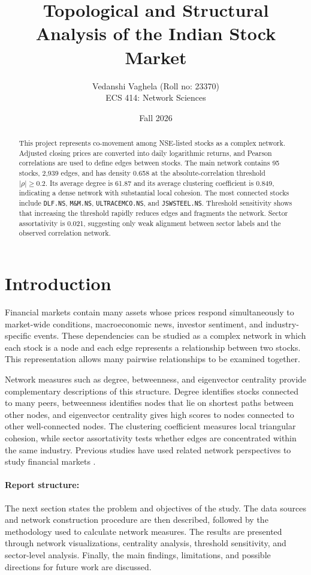 \documentclass[12pt]{article}
\title{Topological and Structural Analysis of the Indian Stock Market}
\author{Vedanshi Vaghela (Roll no: 23370)\\ECS 414: Network Sciences}
\date{Fall 2026}
\numberwithin{equation}{section}
\begin{document}
\maketitle

\begin{abstract}
This project represents co-movement among NSE-listed stocks as a complex
network. Adjusted closing prices are converted into daily logarithmic returns,
and Pearson correlations are used to define edges between stocks. The main
network contains 95 stocks, 2,939 edges, and has density 0.658 at the
absolute-correlation threshold $|\rho|\geq 0.2$. Its average degree is
61.87 and its average clustering coefficient is 0.849, indicating a dense
network with substantial local cohesion. The most connected stocks include
\texttt{DLF.NS}, \texttt{M\&M.NS}, \texttt{ULTRACEMCO.NS}, and
\texttt{JSWSTEEL.NS}. Threshold sensitivity shows that increasing the
threshold rapidly reduces edges and fragments the network. Sector
assortativity is 0.021, suggesting only weak alignment between sector labels
and the observed correlation network.
\end{abstract}

\tableofcontents
\newpage

\section{Introduction}
Financial markets contain many assets whose prices respond simultaneously to
market-wide conditions, macroeconomic news, investor sentiment, and
industry-specific events. These dependencies can be studied as a complex
network in which each stock is a node and each edge represents a relationship
between two stocks. This representation allows many pairwise relationships to
be examined together.

Network measures such as degree, betweenness, and eigenvector centrality provide complementary descriptions of this structure. Degree identifies stocks connected to many peers, betweenness identifies nodes
that lie on shortest paths between other nodes, and eigenvector centrality
gives high scores to nodes connected to other well-connected nodes. The
clustering coefficient measures local triangular cohesion, while sector
assortativity tests whether edges are concentrated within the same industry.
Previous
studies have used related network perspectives to study financial markets
\cite{chi2010network,moghadam2019complex}.

\paragraph{Report structure: } The next section states
the problem and objectives of the study. The data sources and network
construction procedure are then described, followed by the methodology used
to calculate network measures. The results are presented through network
visualizations, centrality analysis, threshold sensitivity, and sector-level
analysis. Finally, the main findings, limitations, and possible directions
for future work are discussed.
\end{document}
